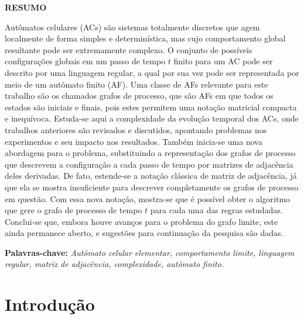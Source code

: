 \documentclass[12pt,a4paper]{article}
\begin{document}
\newpage
\thispagestyle{plain}
\begin{center}
\large  
\textbf{RESUMO}
\end{center}
\renewcommand{\baselinestretch}{0.6666666}
Autômatos celulares (ACs) são sistemas totalmente discretos que agem
localmente de forma simples e determinística, mas cujo comportamento
global resultante pode ser extremamente complexo. O conjunto de possíveis
configurações globais em um passo de tempo $t$ finito para um AC pode ser
descrito por uma linguagem regular, a qual por sua vez pode ser representada
por meio de um autômato finito (AF). Uma classe de AFs relevante para este
trabalho são os chamados grafos de processo, que são AFs em que todos os
estados são iniciais e finais, pois estes permitem uma notação matricial
compacta e inequívoca. Estuda-se aqui a complexidade da evolução temporal
dos ACs, onde trabalhos anteriores são revisados e discutidos, apontando
problemas nos experimentos e seu impacto nos resultados. Também inicia-se
uma nova abordagem para o problema, substituindo a representação dos
grafos de processo que descrevem a configuração a cada passo de tempo
por matrizes de adjacência deles derivadas. De fato, estende-se a notação
clássica de matriz de adjacência, já que ela se mostra insuficiente para
descrever completamente os grafos de processo em questão. Com essa nova
notação, mostra-se que é possível obter o algoritmo que gere o grafo de
processo de tempo $t$ para cada uma das regras estudadas. Conclui-se que,
embora houve avanços para o problema do grafo limite, este ainda permanece
aberto, e sugestões para continuação da pesquisa são dadas.
\\[0.5cm]
\begin{flushleft}
{\bf Palavras-chave:} {\it Autômato celular elementar, comportamento limite,
linguagem regular, matriz de adjacência, complexidade, autômato finito.}
\end{flushleft}

\newpage
\thispagestyle{empty}
\tableofcontents

\newpage
\pagestyle{plain}
\renewcommand{\baselinestretch}{1.5} 
\normalsize

\newcommand{\citecustom}[1]{[\citeauthoronline{#1}, \citeyear{#1}]}

\section{Introdução}
\end{document}
